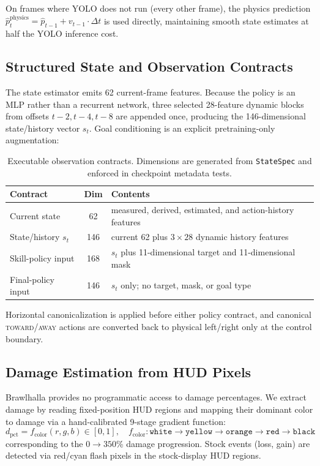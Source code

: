 \documentclass[11pt,a4paper]{article}
\begin{document}
On frames where YOLO does not run (every other frame), the physics prediction $\hat{p}_t^{\text{physics}} = \hat{p}_{t-1} + v_{t-1} \cdot \Delta t$ is used directly, maintaining smooth state estimates at half the YOLO inference cost.

\subsection{Structured State and Observation Contracts}

The state estimator emits 62 current-frame features. Because the policy is an MLP rather
than a recurrent network, three selected 28-feature dynamic blocks from offsets
$t-2,t-4,t-8$ are appended once, producing the 146-dimensional state/history vector
$s_t$. Goal conditioning is an explicit pretraining-only augmentation:

\begin{table}[t]
\centering
\caption{Executable observation contracts. Dimensions are generated from
\texttt{StateSpec} and enforced in checkpoint metadata tests.}
\label{tab:state-spec}
\small
\begin{tabular}{@{}lcl@{}}
\toprule
\textbf{Contract} & \textbf{Dim} & \textbf{Contents} \\
\midrule
Current state & 62 & measured, derived, estimated, and action-history features \\
State/history $s_t$ & 146 & current 62 plus $3\times 28$ dynamic history features \\
Skill-policy input & 168 & $s_t$ plus 11-dimensional target and 11-dimensional mask \\
Final-policy input & 146 & $s_t$ only; no target, mask, or goal type \\
\bottomrule
\end{tabular}
\end{table}

Horizontal canonicalization is applied before either policy contract, and canonical
\textsc{toward}/\textsc{away} actions are converted back to physical left/right only at
the control boundary.

\subsection{Damage Estimation from HUD Pixels}

Brawlhalla provides no programmatic access to damage percentages.
We extract damage by reading fixed-position HUD regions and mapping their dominant color to damage via a hand-calibrated 9-stage gradient function:
\begin{equation}
d_{\text{pct}} = f_{\text{color}}(r, g, b) \in [0, 1],
\quad f_{\text{color}}: \texttt{white} \to \texttt{yellow} \to \texttt{orange} \to \texttt{red} \to \texttt{black}
\end{equation}
corresponding to the $0 \to 350$\% damage progression.
Stock events (loss, gain) are detected via red/cyan flash pixels in the stock-display HUD regions.
\end{document}
